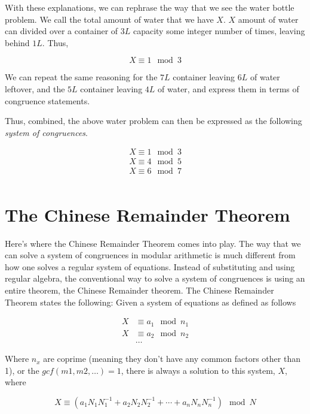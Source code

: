 \documentclass[index]{subfiles}
\begin{document}
With these explanations, we can rephrase the way that we see the water bottle problem. We call the total amount of water that we have \(X\). \(X\) amount of water can divided over a container of \(3L\) capacity some integer number of times, leaving behind \(1L\). Thus,

\begin{equation*}
    X\equiv1\mod3
\end{equation*}

We can repeat the same reasoning for the \(7L\) container leaving \(6L\) of water leftover, and the \(5L\) container leaving \(4L\) of water, and express them in terms of congruence statements.

Thus, combined, the above water problem can then be expressed as the following \textit{system of congruences}.

\begin{align*}
    X\equiv 1\mod 3 \\
    X\equiv 4\mod 5 \\
    X\equiv 6\mod 7 \\
\end{align*}

\section{The Chinese Remainder Theorem}

Here's where the Chinese Remainder Theorem comes into play. The way that we can solve a system of congruences in modular arithmetic is much different from how one solves a regular system of equations. Instead of substituting and using regular algebra, the conventional way to solve a system of congruences is using an entire theorem, the Chinese Remainder theorem. The Chinese Remainder Theorem states the following: Given a system of equations as defined as follows

\begin{align*}
    X & \equiv a_1\mod n_1 \\
    X & \equiv a_2\mod n_2 \\
      & \ldots
\end{align*}

Where \(n_x\) are coprime (meaning they don't have any common factors other than 1), or the \(gcf(m1, m2, \ldots)=1\), there is always a solution to this system, \(X\), where

\begin{equation*}
    X\equiv (a_1N_1N_1^{-1} + a_2N_2N_2^{-1} + \cdots + a_{n}N_{n}N_{n}^{-1})\mod N
\end{equation*}~\parencite{nesoacademyChineseRemainderTheorem2021}
\end{document}
